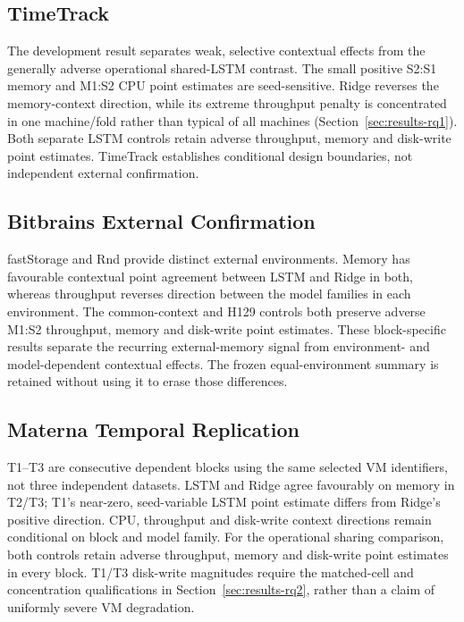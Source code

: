 \documentclass[a4paper,fleqn]{cas-dc}
\begin{document}


\subsection{TimeTrack}

The development result separates weak, selective contextual effects from
the generally adverse operational shared-LSTM contrast. The small positive
S2:S1 memory and M1:S2 CPU point estimates are seed-sensitive. Ridge reverses
the memory-context direction, while its extreme throughput penalty is
concentrated in one machine/fold rather than typical of all machines
(Section~\ref{sec:results-rq1}). Both separate LSTM controls retain adverse
throughput, memory and disk-write point estimates. TimeTrack establishes
conditional design boundaries, not independent external confirmation.

\subsection{Bitbrains External Confirmation}

fastStorage and Rnd provide distinct external environments. Memory has
favourable contextual point agreement between LSTM and Ridge in both, whereas
throughput reverses direction between the model families in each environment.
The common-context and H129 controls both preserve adverse M1:S2 throughput,
memory and disk-write point estimates. These block-specific results separate
the recurring external-memory signal from environment- and model-dependent
contextual effects. The frozen equal-environment summary is retained without
using it to erase those differences.

\subsection{Materna Temporal Replication}

T1--T3 are consecutive dependent blocks using the same selected VM
identifiers, not three independent datasets. LSTM and Ridge agree favourably
on memory in T2/T3; T1's near-zero, seed-variable LSTM point estimate differs
from Ridge's positive direction. CPU, throughput and disk-write context
directions remain conditional on block and model family. For the operational
sharing comparison, both controls retain adverse throughput, memory and
disk-write point estimates in every block. T1/T3 disk-write magnitudes require
the matched-cell and concentration qualifications in
Section~\ref{sec:results-rq2}, rather than a claim of uniformly severe VM
degradation.
\end{document}
